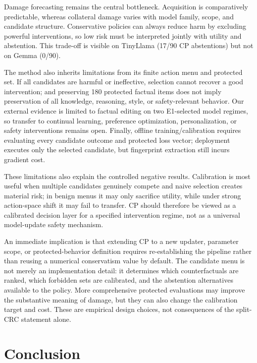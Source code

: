 \documentclass{article} %
\begin{document}
Damage forecasting remains the central bottleneck. Acquisition is
comparatively predictable, whereas collateral damage varies with model family,
scope, and candidate structure. Conservative policies can always reduce harm
by excluding powerful interventions, so low risk must be interpreted jointly
with utility and abstention. This trade-off is visible on TinyLlama (17/90 CP
abstentions) but not on Gemma (0/90).

The method also inherits limitations from its finite action menu and protected
set. If all candidates are harmful or ineffective, selection cannot recover a
good intervention; and preserving 180 protected factual items does not imply
preservation of all knowledge, reasoning, style, or safety-relevant behavior.
Our external evidence is limited to factual editing on two E1-selected model
regimes, so transfer to continual learning, preference optimization,
personalization, or safety interventions remains open. Finally, offline
training/calibration requires evaluating every candidate outcome and protected
loss vector; deployment executes only the selected candidate, but fingerprint
extraction still incurs gradient cost.

These limitations also explain the controlled negative results. Calibration is
most useful when multiple candidates genuinely compete and naive selection
creates material risk; in benign menus it may only sacrifice utility, while
under strong action-space shift it may fail to transfer. CP should therefore be
viewed as a calibrated decision layer for a specified intervention regime, not
as a universal model-update safety mechanism.

An immediate implication is that extending CP to a new updater, parameter
scope, or protected-behavior definition requires re-establishing the pipeline
rather than reusing a numerical conservatism value by default. The candidate
menu is not merely an implementation detail: it determines which
counterfactuals are ranked, which forbidden sets are calibrated, and the
abstention alternatives available to the policy. More comprehensive protected
evaluations may improve the substantive meaning of damage, but they can also
change the calibration target and cost. These are empirical design choices,
not consequences of the split-CRC statement alone.

\section{Conclusion}
\label{sec:conclusion}
\end{document}
